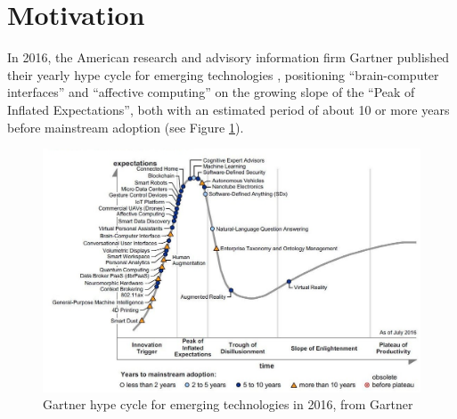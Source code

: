 \section{Motivation}
\label{sec:motivation}
In 2016, the American research and advisory information firm Gartner published their yearly hype cycle for emerging 
technologies , positioning “brain-computer interfaces” and “affective computing” on the growing slope of the “Peak of Inflated Expectations”, both with an estimated period of about 10 or more years before mainstream adoption (see Figure \ref{fig_hype_cycle}).
\begin{figure}[h]
\includegraphics[width=\textwidth]{img/intro/hype_curve_trim.jpg}
\caption{Gartner hype cycle for emerging technologies in 2016, from Gartner\cite{noauthor_gartners_nodate}}\label{fig_hype_cycle}
\end{figure}
